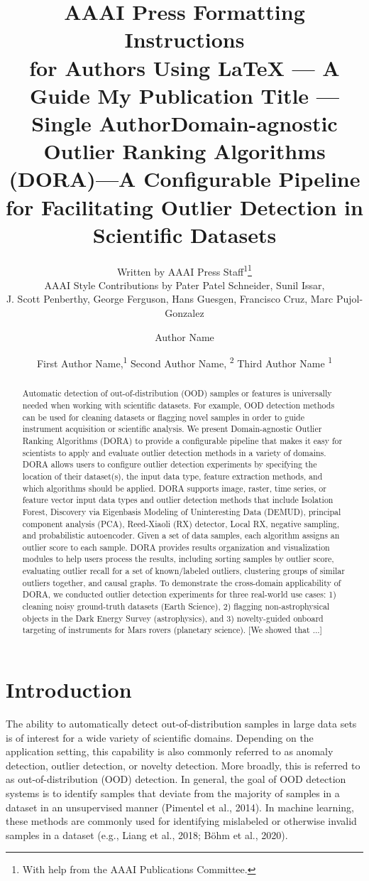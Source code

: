 \documentclass[letterpaper]{article} %
\title{AAAI Press Formatting Instructions \\for Authors Using \LaTeX{} --- A Guide }
\author{
    Written by AAAI Press Staff\textsuperscript{\rm 1}\thanks{With help from the AAAI Publications Committee.}\\
    AAAI Style Contributions by Pater Patel Schneider,
    Sunil Issar,  \\
    J. Scott Penberthy,
    George Ferguson,
    Hans Guesgen,
    Francisco Cruz,
    Marc Pujol-Gonzalez
    \\
}
\title{My Publication Title --- Single Author}
\author {
    Author Name \\
}
\title{Domain-agnostic Outlier Ranking Algorithms (DORA)---A Configurable Pipeline for Facilitating Outlier Detection in Scientific Datasets}
\author {
    First Author Name,\textsuperscript{\rm 1}
    Second Author Name, \textsuperscript{\rm 2}
    Third Author Name \textsuperscript{\rm 1} \\
}
\begin{document}
\maketitle

\begin{abstract}
Automatic detection of out-of-distribution (OOD) samples or features is
universally needed when working with scientific datasets. For example,
OOD detection methods can be used for cleaning datasets or flagging
novel samples in order to guide instrument acquisition or scientific analysis.
We present Domain-agnostic Outlier Ranking Algorithms (DORA) to provide
a configurable pipeline that makes it easy for scientists to apply and evaluate
outlier detection methods in a variety of domains. DORA allows users to 
configure outlier detection experiments by specifying the location of their 
dataset(s), the input data type, feature extraction methods, and which 
algorithms should be applied. DORA supports image, raster, time series, 
or feature vector input data types and outlier detection methods that include
 Isolation Forest, Discovery via Eigenbasis Modeling of Uninteresting Data 
 (DEMUD), principal component analysis (PCA), Reed-Xiaoli (RX) detector, 
 Local RX, negative sampling, and probabilistic autoencoder. Given a set of
  data samples, each algorithm assigns an outlier score to each sample. DORA
   provides results organization and visualization modules to help users 
   process the results, including sorting samples by outlier score, evaluating 
   outlier recall for a set of known/labeled outliers, clustering groups of 
   similar outliers together, and causal graphs. To demonstrate the 
   cross-domain applicability of DORA, we conducted outlier detection
    experiments for three real-world use cases: 1) cleaning noisy ground-truth 
    datasets (Earth Science), 
     2) flagging non-astrophysical objects in the Dark Energy Survey 
     (astrophysics), and 3) novelty-guided onboard targeting of instruments
      for Mars rovers (planetary science). [We showed that ...]
\end{abstract}

\section{Introduction}
The ability to automatically detect out-of-distribution samples in large data 
sets is of interest for a wide variety of scientific domains. Depending on the
 application setting, this capability is also commonly referred to as anomaly
  detection, outlier detection, or novelty detection. More broadly, this is 
  referred to as out-of-distribution (OOD) detection. In general, the goal of 
  OOD detection systems is to identify samples that deviate from the majority
   of samples in a dataset in an unsupervised manner (Pimentel et al., 2014). 
   In machine learning, these methods are commonly used for identifying 
   mislabeled or otherwise invalid samples in a dataset 
   (e.g., Liang et al., 2018; Böhm et al., 2020). 
   
\end{document}
